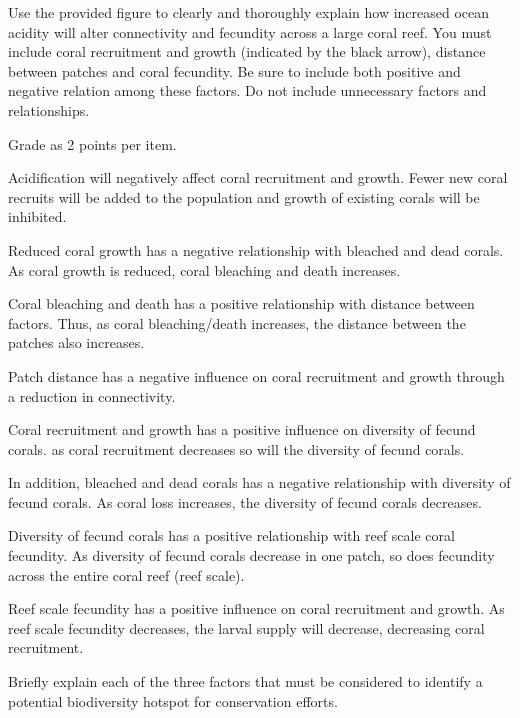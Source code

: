 \documentclass[11pt, addpoints]{exam}
\begin{document}
{\begin{questions}
\newpage


\question[20]
Use the provided figure to clearly and thoroughly explain how increased ocean acidity
will alter connectivity and fecundity across a large coral reef. You must include coral
recruitment and growth (indicated by the black arrow), distance between patches and coral fecundity. Be sure to include both positive and negative relation among these factors. Do not include unnecessary factors and relationships. 

\begin{solution}
Grade as 2 points per item. 

Acidification will negatively affect coral recruitment and growth. Fewer new coral recruits will be added to the population and growth of existing corals will be inhibited.  

Reduced coral growth has a negative relationship with bleached and dead corals. As coral growth is reduced, coral bleaching and death increases.  

Coral bleaching and death has a positive relationship with distance between factors. Thus, as coral bleaching/death increases, the distance between the patches also increases.

Patch distance has a negative influence on coral recruitment and growth through a reduction in connectivity.

Coral recruitment and growth has a positive influence on diversity of fecund corals. as coral recruitment decreases so will the diversity of fecund corals. 

In addition, bleached and dead corals has a negative relationship with diversity of fecund corals. As coral loss increases, the diversity of fecund corals decreases. 

Diversity of fecund corals has a positive relationship with reef scale coral fecundity. As diversity of fecund corals decrease in one patch, so does fecundity across the entire coral reef (reef scale).

Reef scale fecundity has a positive influence on coral recruitment and growth. As reef scale fecundity decreases, the larval supply will decrease, decreasing coral recruitment.

\end{solution}

\newpage

\question[10]
Briefly explain each of the three factors that must be considered to identify
a potential biodiversity hotspot for conservation efforts.


\end{questions}}
\end{document}
